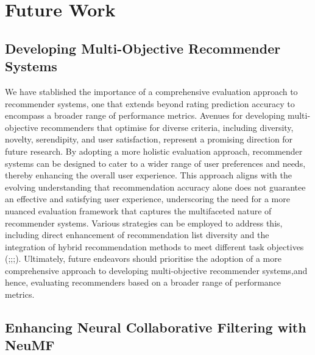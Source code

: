 \section{Future Work}
\label{sec:6 Future Work}

\subsection{Developing Multi-Objective Recommender Systems}
\label{subsec:6 Multi-Objective Recommender Systems}

We have stablished the importance of a comprehensive evaluation approach to recommender systems, one that extends beyond rating prediction accuracy to encompass a broader range of performance metrics. Avenues for developing multi-objective recommenders that optimise for diverse criteria, including diversity, novelty, serendipity, and user satisfaction, represent a promising direction for future research. By adopting a more holistic evaluation approach, recommender systems can be designed to cater to a wider range of user preferences and needs, thereby enhancing the overall user experience. This approach aligns with the evolving understanding that recommendation accuracy alone does not guarantee an effective and satisfying user experience, underscoring the need for a more nuanced evaluation framework that captures the multifaceted nature of recommender systems. Various strategies can be employed to address this, including direct enhancement of recommendation list diversity and the integration of hybrid recommendation methods to meet different task objectives (\cite{smyth2001similarity};\cite{ziegler2005improving};\cite{hurley2011novelty};\cite{zhou2010solving}). Ultimately, future endeavors should prioritise the adoption of a more comprehensive approach to developing multi-objective recommender systems,and hence, evaluating recommenders based on a broader range of performance metrics.

\subsection{Enhancing Neural Collaborative Filtering with NeuMF}
\label{subsec:6 Enhancing Neural Collaborative Filtering with NeuMF}


